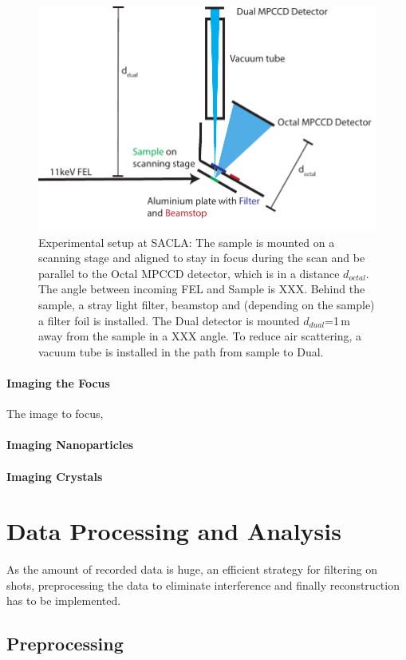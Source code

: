 \begin{figure}
	\centering
	\includegraphics[width=0.8\linewidth]{images/setup.pdf}
	\caption[Experimental setup at SACLA]{Experimental setup at SACLA: The sample is mounted on a scanning stage and aligned to stay in focus during the scan and be parallel to the Octal MPCCD detector, which is in a distance $d_{octal}$. The angle between incoming FEL and Sample is XXX. Behind the sample, a stray light filter, beamstop and (depending on the sample) a filter foil is installed. The Dual detector is mounted $d_{dual}$=1\,m away from the sample in a XXX angle. To reduce air scattering, a vacuum tube is installed in the path from sample to Dual.}
	\label{fig:setup}
\end{figure}
\paragraph{Imaging the Focus}
The image to focus, 
\paragraph{Imaging Nanoparticles}
\paragraph{Imaging Crystals}

\section{Data Processing and Analysis}
As the amount of recorded data is huge, an efficient strategy for filtering on shots, preprocessing the data to eliminate interference and finally reconstruction has to be implemented.
\subsection{Preprocessing}









